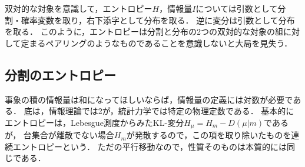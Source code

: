 \documentclass[uplatex,dvipdfmx]{jsreport}
\begin{document}
\begin{notation}
    双対的な対象を意識して，エントロピー$H$，情報量$I$については引数として分割・確率変数を取り，右下添字として分布を取る．
    逆に変分は引数として分布を取る．
    このように，エントロピーは分割と分布の2つの双対的な対象の組に対して定まるペアリングのようなものであることを意識しないと大局を見失う．
\end{notation}

\subsection{分割のエントロピー}

\begin{tcolorbox}[colframe=ForestGreen, colback=ForestGreen!10!white,breakable,colbacktitle=ForestGreen!40!white,coltitle=black,fonttitle=\bfseries\sffamily,
title=]
    事象の積の情報量は和になってほしいならば，情報量の定義には対数が必要である．
    底は，情報理論では2が，統計力学では特定の物理定数である．
    基本的にエントロピーは，Lebesgue測度からみたKL-変分$H_\mu=H_m-D(\mu|m)$であるが，
    台集合が離散でない場合$H_m$が発散するので，この項を取り除いたものを連続エントロピーという．
    ただの平行移動なので，性質そのものは本質的には同じである．
\end{tcolorbox}
\end{document}
